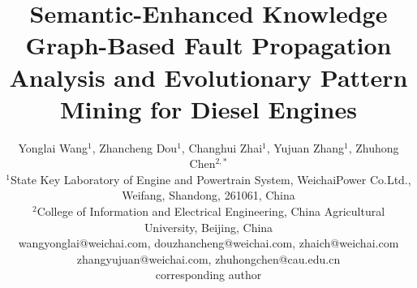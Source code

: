 \documentclass[conference]{IEEEconf}
\begin{document}
\title{\textbf{\Large
Semantic-Enhanced Knowledge Graph-Based Fault Propagation Analysis and Evolutionary Pattern Mining for Diesel Engines
\\}}

\author{Yonglai Wang$^{1}$, Zhancheng Dou$^{1}$, Changhui Zhai$^{1}$, Yujuan Zhang$^{1}$, Zhuhong Chen$^{2,*}$\\
	\normalsize $^{1}$State Key Laboratory of Engine and Powertrain System, WeichaiPower Co.Ltd., Weifang, Shandong, 261061, China\\
    \normalsize $^{2}$College of Information and Electrical Engineering, China Agricultural University, Beijing, China\\
	\normalsize wangyonglai@weichai.com, douzhancheng@weichai.com, zhaich@weichai.com\\
    \normalsize zhangyujuan@weichai.com, zhuhongchen@cau.edu.cn\\
	\normalsize *corresponding author
}

\end{document}
